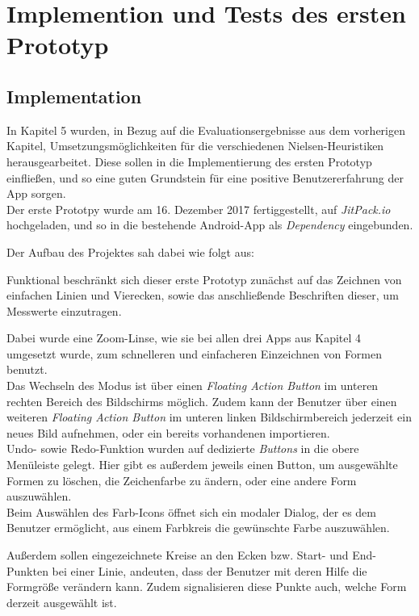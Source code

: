 \section{Implemention und Tests des ersten Prototyp}

\subsection{Implementation}
In Kapitel 5 wurden, in Bezug auf die Evaluationsergebnisse aus dem vorherigen Kapitel, Umsetzungsmöglichkeiten für die verschiedenen Nielsen-Heuristiken herausgearbeitet.
Diese sollen in die Implementierung des ersten Prototyp einfließen, und so eine guten Grundstein für eine positive Benutzererfahrung der App sorgen. \\

Der erste Prototpy wurde am 16. Dezember 2017 fertiggestellt, auf \emph{JitPack.io} hochgeladen, und so in die bestehende Android-App als \emph{Dependency} eingebunden.

Der Aufbau des Projektes sah dabei wie folgt aus:  

Funktional beschränkt sich dieser erste Prototyp zunächst auf das Zeichnen von einfachen Linien und Vierecken, sowie das anschließende Beschriften dieser, um Messwerte einzutragen.

Dabei wurde eine Zoom-Linse, wie sie bei allen drei Apps aus Kapitel 4 umgesetzt wurde, zum schnelleren und einfacheren Einzeichnen von Formen benutzt. \\

Das Wechseln des Modus ist über einen \emph{Floating Action Button} im unteren rechten Bereich des Bildschirms möglich.
Zudem kann der Benutzer über einen weiteren \emph{Floating Action Button} im unteren linken Bildschirmbereich jederzeit ein neues Bild aufnehmen, oder ein bereits vorhandenen importieren. \\

Undo- sowie Redo-Funktion wurden auf dedizierte \emph{Buttons} in die obere Menüleiste gelegt.
Hier gibt es außerdem jeweils einen Button, um ausgewählte Formen zu löschen, die Zeichenfarbe zu ändern, oder eine andere Form auszuwählen. \\

Beim Auswählen des Farb-Icons öffnet sich ein modaler Dialog, der es dem Benutzer ermöglicht, aus einem Farbkreis die gewünschte Farbe auszuwählen.

Außerdem sollen eingezeichnete Kreise an den Ecken bzw. Start- und End-Punkten bei einer Linie, andeuten, dass der Benutzer mit deren Hilfe die Formgröße verändern kann.
Zudem signalisieren diese Punkte auch, welche Form derzeit ausgewählt ist. \\

